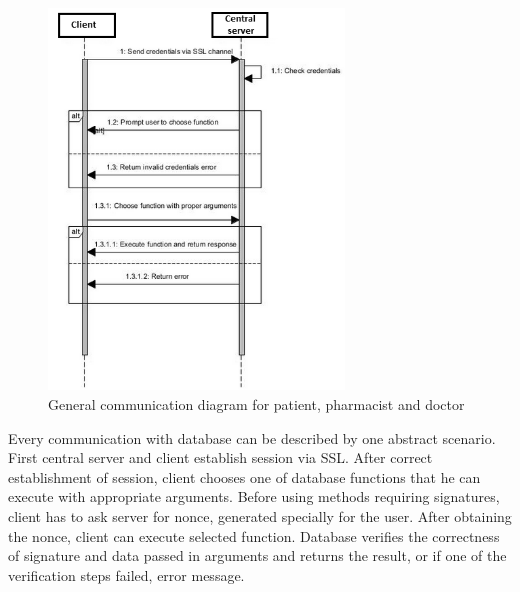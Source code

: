 \chapter{}
\begin{figure}[h]
\centering
\includegraphics[width=0.7\textwidth]{database/sequence.png}
\caption{General communication diagram for patient, pharmacist and doctor}
\end{figure} 
Every communication with database can be described by one abstract scenario.
First central server and client establish session via SSL. After correct establishment of session, client chooses one of database functions that he can execute with appropriate arguments. Before using methods requiring signatures, client has to ask server for nonce, generated specially for the user. After obtaining the nonce, client can execute selected function.
Database verifies the correctness of signature and data passed in arguments and returns the result, or if one of the verification steps failed, error message.


